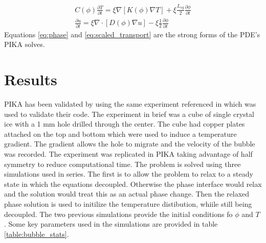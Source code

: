\documentclass[twoside]{article}
\begin{document}
\begin{multicols}{2}
\begin{subequations} \label{eq:scaled_transport}
\begin{align}
	C(\phi)\frac{\partial T}{\partial t} = \xi\nabla [K(\phi) \nabla T] + \xi\frac{L_{sg}}{2}\frac{\partial \phi}{\partial t}\\
	\frac{\partial u}{\partial t} = \xi\nabla \cdot [D(\phi) \nabla u] - \xi \frac{ 1}{2}\frac{\partial \phi}{\partial t}
\end{align}
\end{subequations}
Equations \eqref{eq:phase} and \eqref{eq:scaled_transport} are the strong forms of the PDE's PIKA solves.

\section{Results}

PIKA has been validated by using the same experiment referenced in \cite{Plapp_2009} which was used to validate their code. The experiment in brief was a cube of single crystal ice with a 1 mm hole drilled through the center. The cube had copper plates attached on the top and bottom which were used to induce a temperature gradient. The gradient allows the hole to migrate and the velocity of the bubble was recorded. The experiment was replicated in PIKA taking advantage of half symmetry to reduce computational time. The problem is solved using three simulations used in series. The first is to allow the problem to relax to a steady state in which the equations decoupled. Otherwise the phase interface would relax and the solution would treat this as an actual phase change. Then the relaxed phase solution is used to initilize the temperature distibution, whiile still being decoupled. The two previous simulations provide the initial conditions fo $\phi$ and $T$ . Some key parameters used in the simulations are provided in table \ref{table:bubble_stats}.


\end{multicols}
\end{document}
